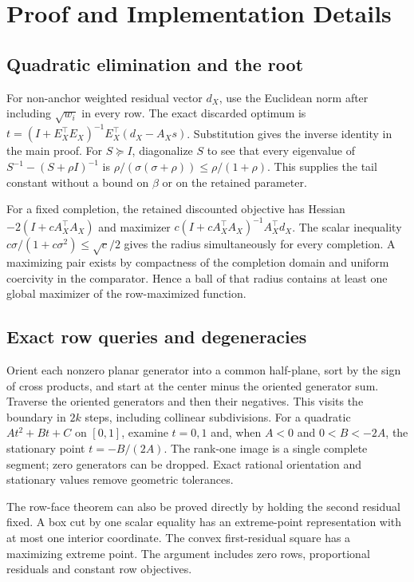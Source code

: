\section{Proof and Implementation Details}
\subsection{Quadratic elimination and the root}
For non-anchor weighted residual vector $d_X$, use the Euclidean norm after including $\sqrt{w_i}$ in every row. The exact discarded optimum is $t=(I+E_X^\top E_X)^{-1}E_X^\top(d_X-A_Xs)$. Substitution gives the inverse identity in the main proof. For $S\succeq I$, diagonalize $S$ to see that every eigenvalue of $S^{-1}-(S+\rho I)^{-1}$ is $\rho/(\sigma(\sigma+\rho))\leq\rho/(1+\rho)$. This supplies the tail constant without a bound on $\beta$ or on the retained parameter.

For a fixed completion, the retained discounted objective has Hessian $-2(I+cA_X^\top A_X)$ and maximizer $c(I+cA_X^\top A_X)^{-1}A_X^\top d_X$. The scalar inequality $c\sigma/(1+c\sigma^2)\leq\sqrt c/2$ gives the radius simultaneously for every completion. A maximizing pair exists by compactness of the completion domain and uniform coercivity in the comparator. Hence a ball of that radius contains at least one global maximizer of the row-maximized function.

\subsection{Exact row queries and degeneracies}
Orient each nonzero planar generator into a common half-plane, sort by the sign of cross products, and start at the center minus the oriented generator sum. Traverse the oriented generators and then their negatives. This visits the boundary in $2k$ steps, including collinear subdivisions. For a quadratic $At^2+Bt+C$ on $[0,1]$, examine $t=0,1$ and, when $A<0$ and $0<B<-2A$, the stationary point $t=-B/(2A)$. The rank-one image is a single complete segment; zero generators can be dropped. Exact rational orientation and stationary values remove geometric tolerances.

The row-face theorem can also be proved directly by holding the second residual fixed. A box cut by one scalar equality has an extreme-point representation with at most one interior coordinate. The convex first-residual square has a maximizing extreme point. The argument includes zero rows, proportional residuals and constant row objectives.

